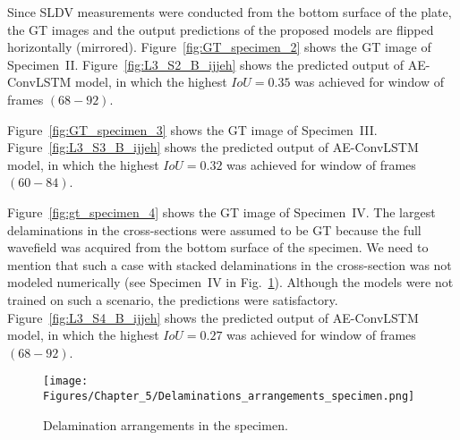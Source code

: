 Since SLDV measurements were conducted from the bottom surface of the plate, the GT images and the output predictions of the proposed models are flipped horizontally (mirrored).
Figure~\ref{fig:GT_specimen_2} shows the GT image of Specimen~II.
Figure~\ref{fig:L3_S2_B_ijjeh} shows the predicted output of AE-ConvLSTM model, in which the highest \(IoU=0.35\) was achieved for window of frames \((68-92)\).

Figure~\ref{fig:GT_specimen_3} shows the GT image of Specimen~III.
Figure~\ref{fig:L3_S3_B_ijjeh} shows the predicted output of AE-ConvLSTM model, in which the highest \(IoU=0.32\) was achieved for window of frames \((60-84)\).

Figure~\ref{fig:gt_specimen_4} shows the GT image of Specimen~IV.
The largest delaminations in the cross-sections were assumed to be GT because the full wavefield was acquired from the bottom surface of the specimen.
We need to mention that such a case with stacked delaminations in the cross-section was not modeled numerically (see Specimen~IV in Fig.~\ref{fig:Delaminations_arrangements_specimen}).
Although the models were not trained on such a scenario, the predictions were satisfactory.
Figure~\ref{fig:L3_S4_B_ijjeh} shows the predicted output of AE-ConvLSTM model, in which the highest \(IoU=0.27\) was achieved for window of frames \((68-92)\).
\begin{figure} [h!]
	\centering
	\texttt{[image: Figures/Chapter\_5/Delaminations\_arrangements\_specimen.png]}
	\caption{Delamination arrangements in the specimen.}
	\label{fig:Delaminations_arrangements_specimen}
\end{figure}
